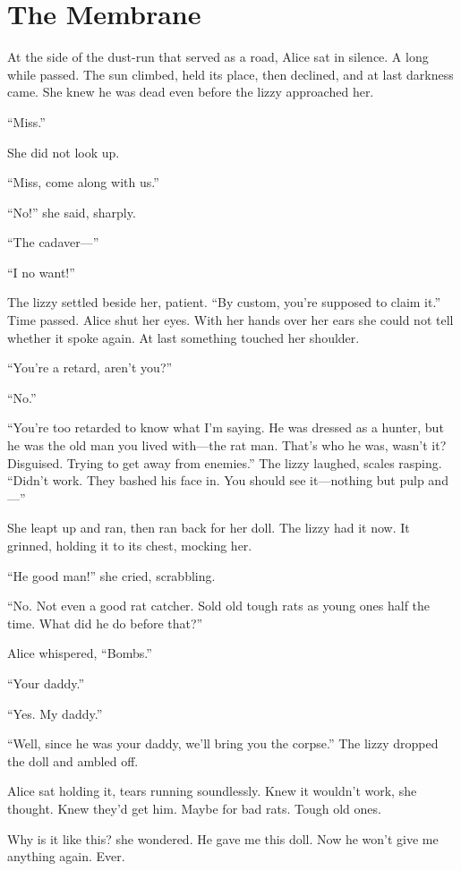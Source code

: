 \chapter{The Membrane}

At the side of the dust-run that served as a road, Alice sat in silence. A long while passed. The sun climbed, held its place, then declined, and at last darkness came. She knew he was dead even before the lizzy approached her.

“Miss.”

She did not look up.

“Miss, come along with us.”

“No!” she said, sharply.

“The cadaver—”

“I no want!”

The lizzy settled beside her, patient. “By custom, you’re supposed to claim it.” Time passed. Alice shut her eyes. With her hands over her ears she could not tell whether it spoke again. At last something touched her shoulder.

“You’re a retard, aren’t you?”

“No.”

“You’re too retarded to know what I’m saying. He was dressed as a hunter, but he was the old man you lived with—the rat man. That’s who he was, wasn’t it? Disguised. Trying to get away from enemies.” The lizzy laughed, scales rasping. “Didn’t work. They bashed his face in. You should see it—nothing but pulp and—”

She leapt up and ran, then ran back for her doll. The lizzy had it now. It grinned, holding it to its chest, mocking her.

“He good man!” she cried, scrabbling.

“No. Not even a good rat catcher. Sold old tough rats as young ones half the time. What did he do before that?”

Alice whispered, “Bombs.”

“Your daddy.”

“Yes. My daddy.”

“Well, since he was your daddy, we’ll bring you the corpse.” The lizzy dropped the doll and ambled off.

Alice sat holding it, tears running soundlessly. Knew it wouldn’t work, she thought. Knew they’d get him. Maybe for bad rats. Tough old ones.

Why is it like this? she wondered. He gave me this doll. Now he won’t give me anything again. Ever.

